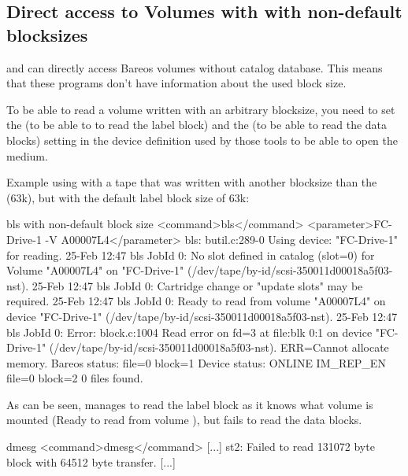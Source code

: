 \subsection*{Direct access to Volumes with with non-default blocksizes}
\label{direct-access-to-volumes-with-non-default-blocksizes}


 and  can directly access Bareos volumes without catalog database.
This means that these programs don't have information about the used block size.

To be able to read a volume written with an arbitrary blocksize, you need to
set the  (to be able to to read the label block) and the
 (to be able to read the data blocks) setting in the
device definition used by those tools to be able to open the medium.

Example using  with a tape that was written with another blocksize than the
 (63k), but with the default label block size of 63k:
\begin{commands}{bls with non-default block size}
<command>bls</command> <parameter>FC-Drive-1 -V A00007L4</parameter>
bls: butil.c:289-0 Using device: "FC-Drive-1" for reading.
25-Feb 12:47 bls JobId 0: No slot defined in catalog (slot=0) for Volume "A00007L4" on "FC-Drive-1" (/dev/tape/by-id/scsi-350011d00018a5f03-nst).
25-Feb 12:47 bls JobId 0: Cartridge change or "update slots" may be required.
25-Feb 12:47 bls JobId 0: Ready to read from volume "A00007L4" on device "FC-Drive-1" (/dev/tape/by-id/scsi-350011d00018a5f03-nst).
25-Feb 12:47 bls JobId 0: Error: block.c:1004 Read error on fd=3 at file:blk 0:1 on device "FC-Drive-1" (/dev/tape/by-id/scsi-350011d00018a5f03-nst). ERR=Cannot allocate memory.
 Bareos status: file=0 block=1
 Device status: ONLINE IM_REP_EN file=0 block=2
0 files found.
\end{commands}

As can be seen,  manages to read the label block as it knows what volume is mounted
(Ready to read from volume ), but fails to read the data blocks.

\begin{commands}{dmesg}
<command>dmesg</command>
[...]
st2: Failed to read 131072 byte block with 64512 byte transfer.
[...]
\end{commands}

